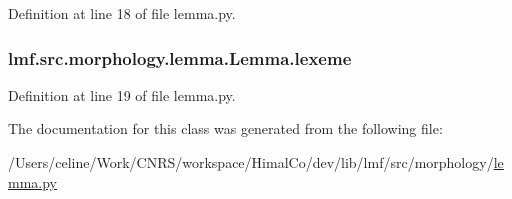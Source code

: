Definition at line 18 of file lemma.\+py.

\hypertarget{classlmf_1_1src_1_1morphology_1_1lemma_1_1_lemma_ab68007ef04c51304b92e3eefcf2f40c9}{
\subsubsection[{lexeme}]{\setlength{\rightskip}{0pt plus 5cm}lmf.\+src.\+morphology.\+lemma.\+Lemma.\+lexeme}}\label{classlmf_1_1src_1_1morphology_1_1lemma_1_1_lemma_ab68007ef04c51304b92e3eefcf2f40c9}


Definition at line 19 of file lemma.\+py.



The documentation for this class was generated from the following file\+:\begin{DoxyCompactItemize}
\item 
/\+Users/celine/\+Work/\+C\+N\+R\+S/workspace/\+Himal\+Co/dev/lib/lmf/src/morphology/\hyperlink{lemma_8py}{lemma.\+py}\end{DoxyCompactItemize}
